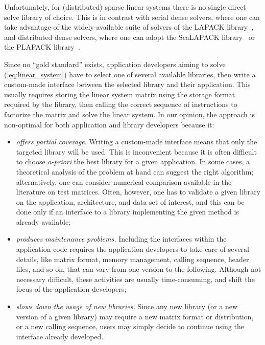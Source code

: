 \documentclass[acmtocl]{acmtrans2m}
\begin{document}
Unfortunately, for (distributed) sparse linear systems there is no single direct
solve library of choice. This is in contrast with serial dense solvers, where
one can take advantage of the widely-available suite of solvers of the LAPACK 
library~\cite{lapack-guide}, and distributed dense solvers, where one can
adopt the ScaLAPACK library~\cite{scalapack-guide} or the PLAPACK library~\cite{plapack}.

Since no ``gold standard'' exists, application developers aiming to solve
(\ref{eq:linear_system}) have to select one of several available libraries,
  then write a custom-made interface between the selected library and
  their application. This usually requires storing the linear system matrix using the
  storage format required by the library, then calling the correct sequence of
  instructions to factorize the matrix and solve the linear system.  In our
  opinion, the approach is non-optimal for both application and library
  developers because it:
\begin{itemize}

\item 
{\sl offers partial coverage}. Writing a custom-made interface means that only the
targeted library will be used.
This is inconvenient because 
it is often difficult to choose {\sl a-priori} the best library for a given
application.
In some cases, a theoretical analysis of
the problem at hand can suggest the right algorithm; alternatively, one can
consider numerical comparison available in the literature
on test matrices. Often, however, one has to validate
a given library on the application, architecture, and data
set of interest, and this can be done only if an interface  to a library
implementing the given method is already available;

\item 
{\sl produces maintenance problems.}
Including the interfaces within the application code requires the application
developers to take care of several details, like matrix format, memory
management, calling sequence, header files, and so on, that can vary 
from one version to the following. Although not necessary difficult, these
activities are usually time-consuming, and shift the focus of the application
developers;

\item 
{\sl slows down the usage of new libraries.} Since any new library 
(or a new version of a given library) may require a new matrix format or
distribution, or a new calling sequence, users may simply decide to continue
using the interface already developed.
\end{itemize}
\end{document}
